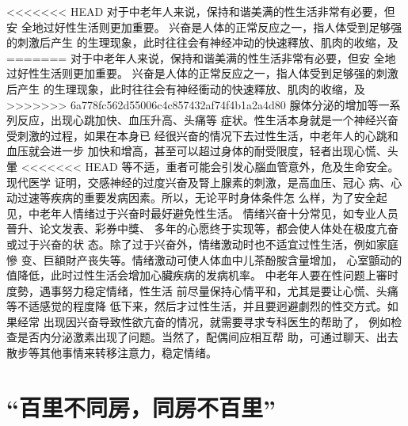 \documentclass[12pt,UTF8]{ctexbook}
\begin{document}
<<<<<<< HEAD
对于中老年人来说，保持和谐美满的性生活非常有必要，但安
全地过好性生活则更加重要。
兴奋是人体的正常反应之一，指人体受到足够强的刺激后产生
的生理现象，此时往往会有神经冲动的快速釋放、肌肉的收缩，及
=======
对于中老年人来说，保持和谐美满的性生活非常有必要，但安
全地过好性生活则更加重要。
兴奋是人体的正常反应之一，指人体受到足够强的刺激后产生
的生理现象，此时往往会有神经衝动的快速釋放、肌肉的收缩，及
>>>>>>> 6a778fc562d55006c4c857432af74f4b1a2a4d80
腺体分泌的增加等一系列反应，出现心跳加快、血压升高、头痛等
症状。性生活本身就是一个神经兴奋受刺激的过程，如果在本身已
经很兴奋的情况下去过性生活，中老年人的心跳和血压就会进一步
加快和增高，甚至可以超过身体的耐受限度，轻者出现心慌、头暈
<<<<<<< HEAD
等不适，重者可能会引发心腦血管意外，危及生命安全。现代医学
证明，交感神经的过度兴奋及腎上腺素的刺激，是高血压、冠心
病、心动过速等疾病的重要发病因素。所以，无论平时身体条件怎
么样，为了安全起见，中老年人情绪过于兴奋时最好避免性生活。
情绪兴奋十分常见，如专业人员晉升、论文发表、彩券中獎、
多年的心愿终于实现等，都会使人体处在极度亢奋或过于兴奋的状
态。除了过于兴奋外，情绪激动时也不适宜过性生活，例如家庭慘
变、巨額財产丧失等。情绪激动可使人体血中儿茶酚胺含量增加，
心室顫动的值降低，此时过性生活会增加心臟疾病的发病机率。
中老年人要在性问题上審时度勢，遇事努力稳定情绪，性生活
前尽量保持心情平和，尤其是要让心慌、头痛等不适感觉的程度降
低下来，然后才过性生活，并且要迥避劇烈的性交方式。如果经常
出现因兴奋导致性欲亢奋的情况，就需要寻求专科医生的帮助了，
例如检查是否内分泌激素出现了问题。当然了，配偶间应相互帮
助，可通过聊天、出去散步等其他事情来转移注意力，稳定情绪。

\section{“百里不同房，同房不百里”}
\end{document}
